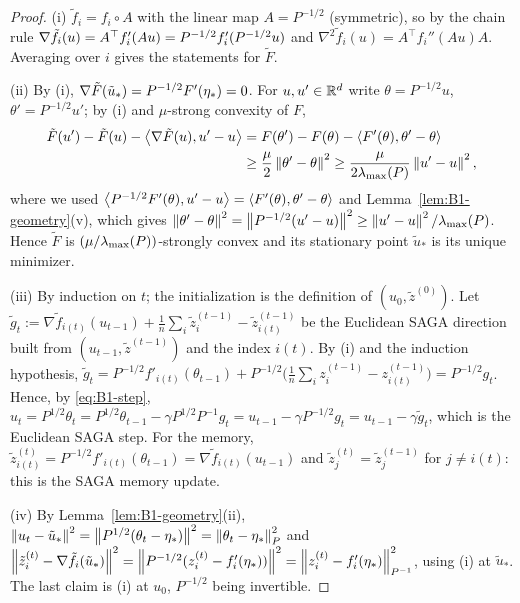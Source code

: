 \begin{proof}
(i) $\tilde f_i=f_i\circ A$ with the linear map $A=P^{-1/2}$ (symmetric), so by the chain rule
$\nabla\tilde f_i(u)=A^\top f'_i(Au)=P^{-1/2}f'_i(P^{-1/2}u)$ and
$\nabla^2\tilde f_i(u)=A^\top f_i''(Au)A$. Averaging over $i$ gives the statements for $\tilde F$.

(ii) By (i), $\nabla\tilde F(\tilde u_*)=P^{-1/2}F'(\eta_\ast)=0$. For $u,u'\in\mathbb{R}^d$ write
$\theta=P^{-1/2}u$, $\theta'=P^{-1/2}u'$; by (i) and $\mu$-strong convexity of $F$,
\begin{align*}
\tilde F(u')-\tilde F(u)-\left\langle \nabla\tilde F(u), u'-u \right\rangle
&=F(\theta')-F(\theta)-\left\langle F'(\theta), \theta'-\theta \right\rangle\\
&\ge\frac\mu2\left\|\theta'-\theta\right\|^2\ge\frac{\mu}{2\lambda_{\max}(P)}\left\|u'-u\right\|^2 ,
\end{align*}
where we used $\left\langle P^{-1/2}F'(\theta), u'-u \right\rangle=\left\langle F'(\theta), \theta'-\theta \right\rangle$ and
Lemma~\ref{lem:B1-geometry}(v), which gives
$\left\|\theta'-\theta\right\|^2=\left\|P^{-1/2}(u'-u)\right\|^2\ge\left\|u'-u\right\|^2/\lambda_{\max}(P)$.
Hence $\tilde F$ is $(\mu/\lambda_{\max}(P))$-strongly convex and its stationary point $\tilde u_*$ is its unique
minimizer.

(iii) By induction on $t$; the initialization is the definition of $(u_0,\tilde z^{(0)})$. Let
$\tilde g_t:=\nabla\tilde f_{i(t)}(u_{t-1})+\frac1n\sum_i\tilde z_i^{(t-1)}-\tilde z_{i(t)}^{(t-1)}$ be the
Euclidean SAGA direction built from $(u_{t-1},\tilde z^{(t-1)})$ and the index $i(t)$. By (i) and the
induction hypothesis,
$\tilde g_t=P^{-1/2}f'_{i(t)}(\theta_{t-1})+P^{-1/2}\big(\frac1n\sum_i z_i^{(t-1)}-z_{i(t)}^{(t-1)}\big)
=P^{-1/2}g_t$. Hence, by \eqref{eq:B1-step},
$u_t=P^{1/2}\theta_t=P^{1/2}\theta_{t-1}-\gamma P^{1/2}P^{-1}g_t=u_{t-1}-\gamma P^{-1/2}g_t
=u_{t-1}-\gamma\tilde g_t$, which is the Euclidean SAGA step. For the memory,
$\tilde z_{i(t)}^{(t)}=P^{-1/2}f'_{i(t)}(\theta_{t-1})=\nabla\tilde f_{i(t)}(u_{t-1})$ and
$\tilde z_j^{(t)}=\tilde z_j^{(t-1)}$ for $j\neq i(t)$: this is the SAGA memory update.

(iv) By Lemma~\ref{lem:B1-geometry}(ii),
$\left\|u_t-\tilde u_*\right\|^2=\left\|P^{1/2}(\theta_t-\eta_\ast)\right\|^2=\left\|\theta_t-\eta_\ast\right\|_P^2$ and
$\left\|\tilde z_i^{(t)}-\nabla\tilde f_i(\tilde u_*)\right\|^2=\left\|P^{-1/2}(z_i^{(t)}-f'_i(\eta_\ast))\right\|^2
=\left\|z_i^{(t)}-f'_i(\eta_\ast)\right\|_{P^{-1}}^2$, using (i) at $\tilde u_*$. The last claim is (i) at $u_0$,
$P^{-1/2}$ being invertible.
\end{proof}

